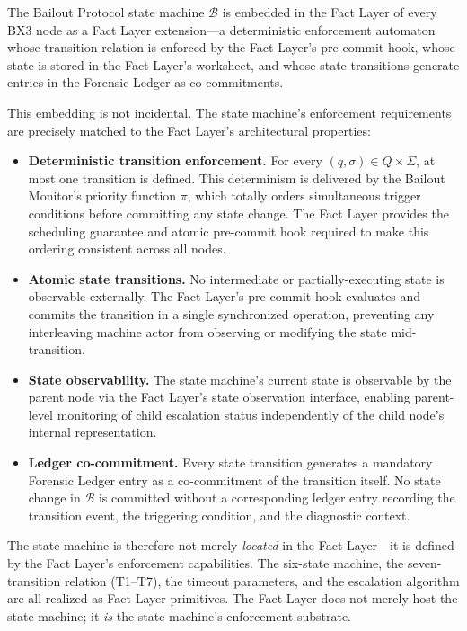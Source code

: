 The Bailout Protocol state machine $\mathcal{B}$ is embedded in the Fact Layer
of every BX3 node as a Fact Layer extension---a deterministic enforcement
automaton whose transition relation is enforced by the Fact Layer's pre-commit
hook, whose state is stored in the Fact Layer's worksheet, and whose state
transitions generate entries in the Forensic Ledger as co-commitments.

This embedding is not incidental.  The state machine's enforcement requirements
are precisely matched to the Fact Layer's architectural properties:

\begin{itemize}\itemsep=0pt
\item[(\textit{i})] \textbf{Deterministic transition enforcement.}  For every
$(q, \sigma) \in Q \times \Sigma$, at most one transition is defined.  This
determinism is delivered by the Bailout Monitor's priority function $\pi$, which
totally orders simultaneous trigger conditions before committing any state change.
The Fact Layer provides the scheduling guarantee and atomic pre-commit hook
required to make this ordering consistent across all nodes.

\item[(\textit{ii})] \textbf{Atomic state transitions.}  No intermediate or
partially-executing state is observable externally.  The Fact Layer's pre-commit
hook evaluates and commits the transition in a single synchronized operation,
preventing any interleaving machine actor from observing or modifying the state
mid-transition.

\item[(\textit{iii})] \textbf{State observability.}  The state machine's current
state is observable by the parent node via the Fact Layer's state observation
interface, enabling parent-level monitoring of child escalation status
independently of the child node's internal representation.

\item[(\textit{iv})] \textbf{Ledger co-commitment.}  Every state transition
generates a mandatory Forensic Ledger entry as a co-commitment of the transition
itself.  No state change in $\mathcal{B}$ is committed without a corresponding
ledger entry recording the transition event, the triggering condition, and the
diagnostic context.
\end{itemize}

The state machine is therefore not merely \emph{located} in the Fact Layer---it
is defined by the Fact Layer's enforcement capabilities.  The six-state machine,
the seven-transition relation (T1--T7), the timeout parameters, and the
escalation algorithm are all realized as Fact Layer primitives.  The Fact Layer
does not merely host the state machine; it \emph{is} the state machine's
enforcement substrate.

